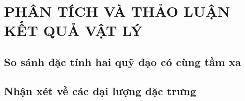 \chapter{PHÂN TÍCH VÀ THẢO LUẬN KẾT QUẢ VẬT LÝ}
\section{So sánh đặc tính hai quỹ đạo có cùng tầm xa}

\section{Nhận xét về các đại lượng đặc trưng}

